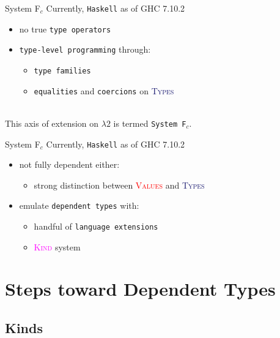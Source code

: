 \documentclass[xcolor={usenames,dvipsnames}]{beamer}
\newcommand{\htycon}[1]{\textcolor{MidnightBlue}{\textsc{#1}}}
\newcommand{\hvalcon}[1]{\textcolor{Red}{\textsc{#1}}}
\newcommand{\hkind}[1]{\textcolor{Fuchsia}{\textsc{#1}}}
\begin{document}
\begin{frame}[fragile]{System F$_c$}
  Currently, \texttt{Haskell} as of GHC 7.10.2
  \begin{itemize}
    \item no true \texttt{type operators}
    \item \texttt{type-level programming} through:
      \begin{itemize}
        \item \texttt{type families}
        \item \texttt{equalities} and \texttt{coercions} on \htycon{Types}
      \end{itemize}
  \end{itemize}

  \ \\
  This axis of extension on $\lambda2$ is termed \texttt{System F$_c$}.
\end{frame}

\begin{frame}[fragile]{System F$_c$}
  Currently, \texttt{Haskell} as of GHC 7.10.2
  \begin{itemize}
    \item not fully dependent either:
      \begin{itemize}
        \item strong distinction between \hvalcon{Values} and \htycon{Types}
      \end{itemize}
    \item emulate \texttt{dependent types} with:
      \begin{itemize}
        \item handful of \texttt{language extensions}
        \item \hkind{Kind} system
      \end{itemize}
  \end{itemize}
\end{frame}


\section{Steps toward Dependent Types}

\subsection{Kinds}
\end{document}
